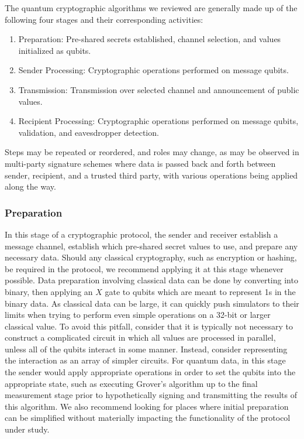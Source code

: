 \documentclass[sigconf]{acmart}
\begin{document}
The quantum cryptographic algorithms we reviewed are generally made up of the following four stages and their corresponding activities:
\begin{enumerate} %
\item Preparation: Pre-shared secrets established, channel selection, and values initialized as qubits.
\item Sender Processing: Cryptographic operations performed on message qubits.
\item Transmission: Transmission over selected channel and announcement of public values.
\item Recipient Processing: Cryptographic operations performed on message qubits, validation, and eavesdropper detection.
\end{enumerate}
Steps may be repeated or reordered, and roles may change, as may be observed in multi-party signature schemes where data is passed back and forth between sender, recipient, and a trusted third party, with various operations being applied along the way.

\subsubsection{Preparation}
In this stage of a cryptographic protocol, the sender and receiver establish a message channel, establish which pre-shared secret values to use, and prepare any necessary data. Should any classical cryptography, such as encryption or hashing, be required in the protocol, we recommend applying it at this stage whenever possible. Data preparation involving classical data can be done by converting into binary, then applying an $X$ gate to qubits which are meant to represent 1s in the binary data. As classical data can be large, it can quickly push simulators to their limits when trying to perform even simple operations on a 32-bit or larger classical value. To avoid this pitfall, consider that it is typically not necessary to construct a complicated circuit in which all values are processed in parallel, unless all of the qubits interact in some manner. Instead, consider representing the interaction as an array of simpler circuits. For quantum data, in this stage the sender would apply appropriate operations in order to set the qubits into the appropriate state, such as executing Grover's algorithm up to the final measurement stage prior to hypothetically signing and transmitting the results of this algorithm. We also recommend looking for places where initial preparation can be simplified without materially impacting the functionality of the protocol under study.
\end{document}
